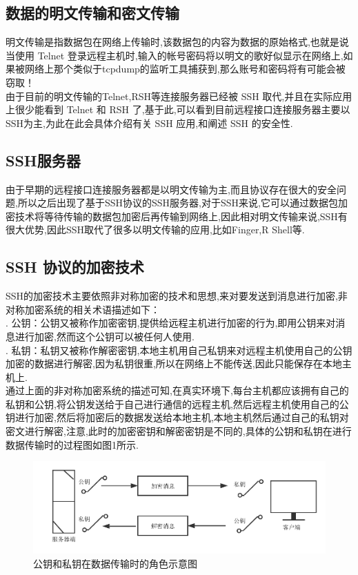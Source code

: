 \documentclass[UTF8,a4paper,cs4size]{ctexart}
\begin{document}
\subsection{数据的明文传输和密文传输}
明文传输是指数据包在网络上传输时,该数据包的内容为数据的原始格式,也就是说当使用 Telnet 登录远程主机时,输入的帐号密码将以明文的歌好似显示在网络上,如果被网络上那个类似于tcpdump的监听工具捕获到,那么账号和密码将有可能会被窃取！\\
\indent 由于目前的明文传输的Telnet,RSH等连接服务器已经被 SSH 取代,并且在实际应用上很少能看到 Telnet 和 RSH 了,基于此,可以看到目前远程接口连接服务器主要以SSH为主,为此在此会具体介绍有关 SSH 应用,和阐述 SSH 的安全性.
\subsection{SSH服务器}
由于早期的远程接口连接服务器都是以明文传输为主,而且协议存在很大的安全问题,所以之后出现了基于SSH协议的SSH服务器,对于SSH来说,它可以通过数据包加密技术将等待传输的数据包加密后再传输到网络上,因此相对明文传输来说,SSH有很大优势,因此SSH取代了很多以明文传输的应用,比如Finger,R Shell等.
\subsection{SSH 协议的加密技术}
SSH的加密技术主要依照非对称加密的技术和思想,来对要发送到消息进行加密,非对称加密系统的相关术语描述如下：\\
. 公钥：公钥又被称作加密密钥,提供给远程主机进行加密的行为,即用公钥来对消息进行加密,然而这个公钥可以被任何人使用.\\
. 私钥：私钥又被称作解密密钥,本地主机用自己私钥来对远程主机使用自己的公钥加密的数据进行解密,因为私钥很重,所以在网络上不能传送,因此只能保存在本地主机上.\\
\indent 通过上面的非对称加密系统的描述可知,在真实环境下,每台主机都应该拥有自己的私钥和公钥,将公钥发送给于自己进行通信的远程主机,然后远程主机使用自己的公钥进行加密,然后将加密后的数据发送给本地主机,本地主机然后通过自己的私钥对密文进行解密,注意,此时的加密密钥和解密密钥是不同的,具体的公钥和私钥在进行数据传输时的过程图如图1所示.

\begin{figure}[htbp]
\centering
\includegraphics[scale = 0.7]{1-1.pdf}
\caption{公钥和私钥在数据传输时的角色示意图}
\end{figure}
\end{document}
